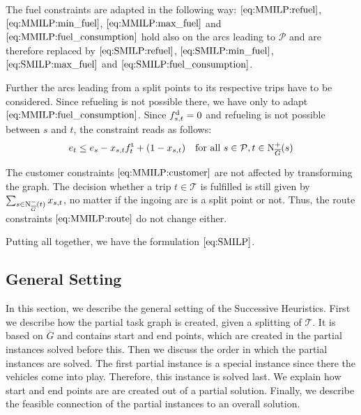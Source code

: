 The fuel constraints are adapted in the following way: $\eqref{eq:MMILP:refuel}$, $\eqref{eq:MMILP:min_fuel}$, $\eqref{eq:MMILP:max_fuel}$ and $\eqref{eq:MMILP:fuel_consumption}$ hold also on the arcs leading to $\mathcal{P}$ and are therefore replaced by $\eqref{eq:SMILP:refuel}$, $\eqref{eq:SMILP:min_fuel}$, $\eqref{eq:SMILP:max_fuel}$ and $\eqref{eq:SMILP:fuel_consumption}$.

Further the arcs leading from a split points to its respective trips have to be considered. Since refueling is not possible there, we have only to adapt $\eqref{eq:MMILP:fuel_consumption}$. Since $f^{\operatorname{d}}_{s,t} = 0$ and refueling is not possible between $s$ and $t$, the constraint reads as follows:
\begin{align}
	e_t \leq e_s - x_{s,t}f^{\operatorname{t}}_t + \left(1-x_{s,t}\right) && \text{for all } s\in \mathcal{P},t\in\operatorname{N}_{\overline{G}}^+(s) \label{eq:SMILP:fuel_splitpoint}
\end{align}

The customer constraints $\eqref{eq:MMILP:customer}$ are not affected by transforming the graph. The decision whether a trip $t\in\mathcal{T}$ is fulfilled is still given by $\sum_{s\in\operatorname{N}_{\overline{G}}^-(t)} x_{s,t}$, no matter if the ingoing arc is a split point or not. Thus, the route constraints $\eqref{eq:MMILP:route}$ do not change either.

Putting all together, we have the formulation $\eqref{eq:SMILP}$.


\subsection{General Setting}
\label{sec:general_setting}

In this section, we describe the general setting of the Successive Heuristics. First we describe how the partial task graph is created, given a splitting of $\mathcal{T}$. It is based on $\overline{G}$ and contains start and end points, which are created in the partial instances solved before this. Then we discuss the order in which the partial instances are solved. The first partial instance is a special instance since there the vehicles come into play. Therefore, this instance is solved last. We explain how start and end points are are created out of a partial solution. Finally, we describe the feasible connection of the partial instances to an overall solution.


